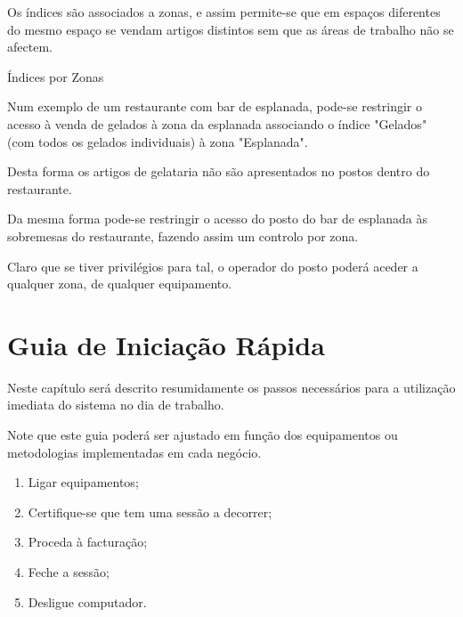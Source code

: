 \documentclass[a4paper,11pt,openany]{memoir}
\newcommand\exemplo{\texttt{[image: ../small-n-flat-master/png/96/notepad.png]}}
\newcommand{\bcexemplo}[2]{\vspace{5mm}\begin{bclogo}[couleur=green!30,logo=\exemplo]{\hspace{0.7cm}#1}{#2}\end{bclogo}}
\begin{document}
Os índices são associados a zonas, e assim permite-se que em espaços diferentes do mesmo espaço se vendam 
artigos distintos sem que as áreas de trabalho não se afectem. 


\bcexemplo{Índices por Zonas}{
Num exemplo de um restaurante com bar de esplanada, pode-se restringir o acesso à venda de gelados
à zona da esplanada associando o índice "Gelados" (com todos os gelados individuais) à zona "Esplanada".

Desta forma os artigos de gelataria não são apresentados no postos dentro do restaurante. 

Da mesma forma pode-se restringir o acesso do posto do bar de esplanada às sobremesas do restaurante, fazendo assim um controlo por zona.

Claro que se tiver privilégios para tal, o operador do posto poderá aceder a qualquer zona, de qualquer equipamento.
}
  











\chapter{Guia de Iniciação Rápida}  %

Neste capítulo será descrito resumidamente os passos necessários para a utilização imediata do sistema no dia de trabalho.

Note que este guia poderá ser ajustado em função dos equipamentos ou metodologias implementadas em cada negócio.

\begin{enumerate}
	\item Ligar equipamentos;
	\item Certifique-se que tem uma sessão a decorrer;
	\item Proceda à facturação;
	\item Feche a sessão;
	\item Desligue computador.
\end{enumerate}
\end{document}
